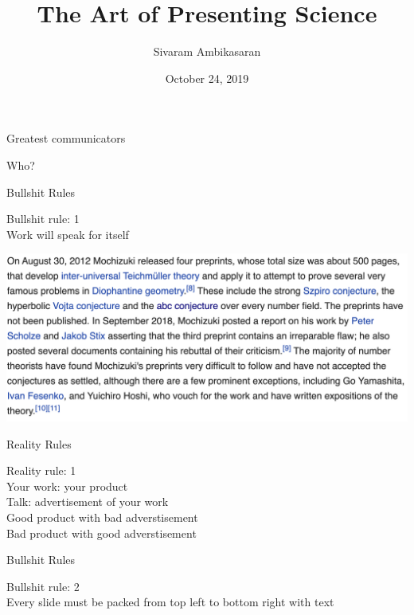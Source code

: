 \documentclass{beamer}
\title[\color{white}The Art of Presenting Science]{\Huge The Art of Presenting Science}
\date[\color{white}October 24, 2019]{October 24, 2019}
\author[\color{white}Sivaram Ambikasaran]{Sivaram Ambikasaran}
\newcommand{\BS}[1]{\Huge{Bullshit rule: #1}\\}
\newcommand{\RR}[1]{\color{white}\Huge{Reality rule: #1}\\}
\newcommand{\BBS}{Bullshit Rules}
\newcommand{\RRS}{\color{white}Reality Rules}
\begin{document}
\frame{\titlepage}

\begin{frame}{\color{white}Greatest communicators}
	\begin{center}
		\color{white}\Huge{Who?}
	\end{center}
\end{frame}

\begin{frame}{\BBS}
	\begin{center}
		\BS{1}
		\Huge{Work will speak for itself}
	\end{center}
\end{frame}

\begin{frame}
	\includegraphics[width=\textwidth]{./Mochizuki.png}
\end{frame}

\begin{frame}{\RRS}
	\begin{center}
		\RR{1}
		\Huge{Your work: your product}\\
		\Huge{Talk: advertisement of your work}\\
		\LARGE{Good product with bad adverstisement \frownie{}}\\
		\LARGE{Bad product with good adverstisement \frownie{}}\\
	\end{center}
\end{frame}

\begin{frame}{\BBS}
	\begin{center}
		\BS{2}
		\Huge{Every slide must be packed from top left to bottom right with text}
	\end{center}
\end{frame}
\end{document}
